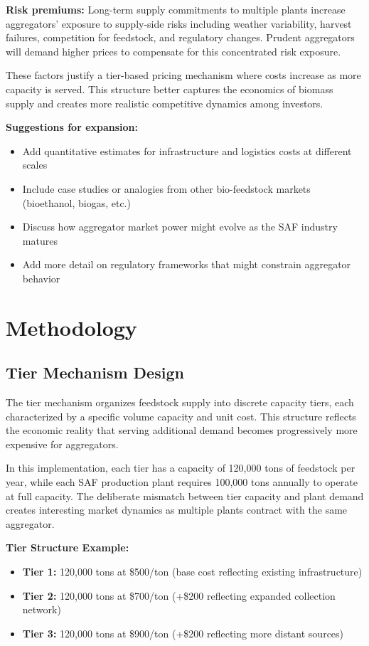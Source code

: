 \documentclass[10.5pt]{article}
\begin{document}
\textbf{Risk premiums:} Long-term supply commitments to multiple plants increase aggregators' exposure to supply-side risks including weather variability, harvest failures, competition for feedstock, and regulatory changes. Prudent aggregators will demand higher prices to compensate for this concentrated risk exposure.

These factors justify a tier-based pricing mechanism where costs increase as more capacity is served. This structure better captures the economics of biomass supply and creates more realistic competitive dynamics among investors.

\textbf{Suggestions for expansion:}
\begin{itemize}
    \item Add quantitative estimates for infrastructure and logistics costs at different scales
    \item Include case studies or analogies from other bio-feedstock markets (bioethanol, biogas, etc.)
    \item Discuss how aggregator market power might evolve as the SAF industry matures
    \item Add more detail on regulatory frameworks that might constrain aggregator behavior
\end{itemize}

\newpage
\section{Methodology}

\subsection{Tier Mechanism Design}

The tier mechanism organizes feedstock supply into discrete capacity tiers, each characterized by a specific volume capacity and unit cost. This structure reflects the economic reality that serving additional demand becomes progressively more expensive for aggregators.

In this implementation, each tier has a capacity of 120,000 tons of feedstock per year, while each SAF production plant requires 100,000 tons annually to operate at full capacity. The deliberate mismatch between tier capacity and plant demand creates interesting market dynamics as multiple plants contract with the same aggregator.

\textbf{Tier Structure Example:}
\begin{itemize}
    \item \textbf{Tier 1:} 120,000 tons at \$500/ton (base cost reflecting existing infrastructure)
    \item \textbf{Tier 2:} 120,000 tons at \$700/ton (+\$200 reflecting expanded collection network)
    \item \textbf{Tier 3:} 120,000 tons at \$900/ton (+\$200 reflecting more distant sources)
\end{itemize}
\end{document}

